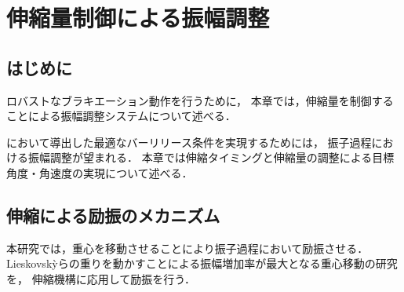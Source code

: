 \chapter[伸縮量制御による振幅調整]%
{伸縮量制御による振幅調整}
        \section{はじめに}

        ロバストなブラキエーション動作を行うために，
        本章では，伸縮量を制御することによる振幅調整システムについて述べる．

        において導出した最適なバーリリース条件を実現するためには，
        振子過程における振幅調整が望まれる．
        本章では伸縮タイミングと伸縮量の調整による目標角度・角速度の実現について述べる．
          
        \section{伸縮による励振のメカニズム}

          本研究では，重心を移動させることにより振子過程において励振させる．
          Lieskovsk{\`y}らの重りを動かすことによる振幅増加率が最大となる重心移動の研究\cite{lieskovsky2023optimal}を，
          伸縮機構に応用して励振を行う．
          
